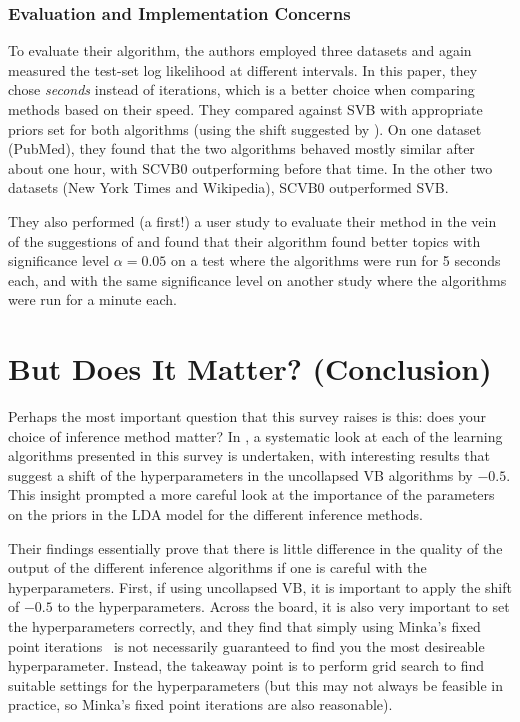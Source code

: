 \documentclass[11pt]{article}
\begin{document}
\subsubsection{Evaluation and Implementation Concerns}

To evaluate their algorithm, the authors employed three datasets and again
measured the test-set log likelihood at different intervals. In this paper,
they chose \emph{seconds} instead of iterations, which is a better choice
when comparing methods based on their speed. They compared against SVB with
appropriate priors set for both algorithms (using the shift suggested
by \citet{Asuncion:2009:onsmoothing}). On one dataset (PubMed), they found
that the two algorithms behaved mostly similar after about one hour, with
SCVB0 outperforming before that time. In the other two datasets (New York
Times and Wikipedia), SCVB0 outperformed SVB.

They also performed (a first!) a user study to evaluate their method in the
vein of the suggestions of \citet{Chang:2009:tealeaves} and found that their
algorithm found better topics with significance level $\alpha = 0.05$ on a
test where the algorithms were run for 5 seconds each, and with the same
significance level on another study where the algorithms were run for a
minute each.

\section{But Does It Matter? (Conclusion)}

Perhaps the most important question that this survey raises is this:
does your choice of inference method matter? In
\citet{Asuncion:2009:onsmoothing}, a systematic look at each of the
learning algorithms presented in this survey is undertaken, with
interesting results that suggest a shift of the hyperparameters in the
uncollapsed VB algorithms by $-0.5$. This insight prompted a more careful
look at the importance of the parameters on the priors in the LDA model for
the different inference methods.

Their findings essentially prove that there is little difference in the
quality of the output of the different inference algorithms if one is
careful with the hyperparameters. First, if using uncollapsed VB, it is
important to apply the shift of $-0.5$ to the hyperparameters. Across the
board, it is also very important to set the hyperparameters correctly, and
they find that simply using Minka's fixed point
iterations~\cite{Minka:2000:fpiter} is not necessarily guaranteed to find you
the most desireable hyperparameter.  Instead, the takeaway point is to perform
grid search to find suitable settings for the hyperparameters (but this may not
always be feasible in practice, so Minka's fixed point iterations are also
reasonable).
\end{document}
